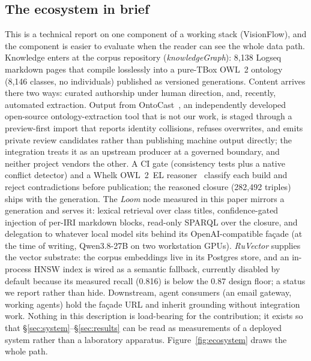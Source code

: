 \documentclass[10pt,twocolumn]{article}
\begin{document}
\subsection{The ecosystem in brief}\label{sec:ecosystem}
This is a technical report on one component of a working stack (VisionFlow), and the component is
easier to evaluate when the reader can see the whole data path. Knowledge enters at the corpus
repository (\emph{knowledgeGraph}): 8{,}138 Logseq markdown pages that compile losslessly into a
pure-TBox OWL~2 ontology (8{,}146 classes, no individuals) published as versioned generations.
Content arrives there two ways: curated authorship under human direction, and, recently, automated
extraction. Output from OntoCast~\cite{ontocast}, an independently developed open-source
ontology-extraction tool that is not our work, is staged through a preview-first import that
reports identity collisions, refuses overwrites, and emits private review candidates rather than
publishing machine output directly; the integration treats it as an upstream producer at a
governed boundary, and neither project vendors the other. A CI gate (consistency tests plus a native conflict detector)
and a Whelk OWL~2~EL reasoner~\cite{whelk} classify each build and reject contradictions before
publication; the reasoned closure (282{,}492 triples) ships with the generation. The \emph{Loom}
node measured in this paper mirrors a generation and serves it: lexical retrieval over class
titles, confidence-gated injection of per-IRI markdown blocks, read-only SPARQL over the closure,
and delegation to whatever local model sits behind its OpenAI-compatible fa\c{c}ade (at the time of
writing, Qwen3.8-27B on two workstation GPUs). \emph{RuVector} supplies the vector substrate: the
corpus embeddings live in its Postgres store, and an in-process HNSW index is wired as a semantic
fallback, currently disabled by default because its measured recall (0.816) is below the
0.87 design floor; a status we report rather than hide. Downstream, agent consumers
(an email gateway, working agents) hold the fa\c{c}ade URL and inherit grounding without
integration work. Nothing in this description is load-bearing for the contribution; it exists so
that \S\ref{sec:system}--\S\ref{sec:results} can be read as measurements of a deployed system
rather than a laboratory apparatus. Figure~\ref{fig:ecosystem} draws the whole path.


\end{document}
